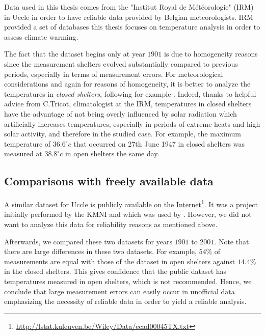 Data used in this thesis comes from the "Institut Royal de Météorologie" (IRM) in Uccle in order to have reliable data provided by Belgian meteorologists.
IRM provided a set of databases this thesis focuses on temperature analysis in order to assess climate warming.%

The fact that the dataset begins only at year $1901$ is due to homogeneity reasons since the measurement shelters evolved substantially compared to previous periods, especially in terms of measurement errors. 
For meteorological considerations and again for reasons of homogeneity, it is better to analyze the temperatures in \emph{closed shelters}, following for example \citet{lindsey_use_1956}. Indeed, thanks to helpful advice from C.Tricot, climatologist at the IRM, temperatures in closed shelters have the advantage of not being overly influenced by solar radiation which artificially increases temperatures, especially in periods of extreme heats and high solar activity, and therefore in the studied case. 
For example, the maximum temperature of $36.6^{\circ}c$ that occurred on 27th June 1947 in closed shelters was measured at $38.8^{\circ}c$ in open shelters the same day.



\subsection*{Comparisons with freely available data} 

A similar dataset for Uccle is publicly available on the \href{http://lstat.kuleuven.be/Wiley/Data/ecad00045TX.txt}{Internet}\footnote{\url{http://lstat.kuleuven.be/Wiley/Data/ecad00045TX.txt}}. It was a project initially performed by the KMNI and which was used by \citet{beirlant_statistics_2006}. However, we did not want to analyze this data for reliability reasons as mentioned above.

Afterwards, we compared these two datasets for years $1901$ to $2001$. Note that there are large differences
in these two datasets. For example,
$54\%$ of measurements are equal with those of the dataset in open shelters against $14.4\%$ in the closed shelters. This gives confidence that the public dataset has temperatures measured in open shelters, which is not recommended. Hence, we conclude that large measurement errors can easily occur in unofficial data emphasizing the necessity of reliable data in order to yield a reliable analysis.

